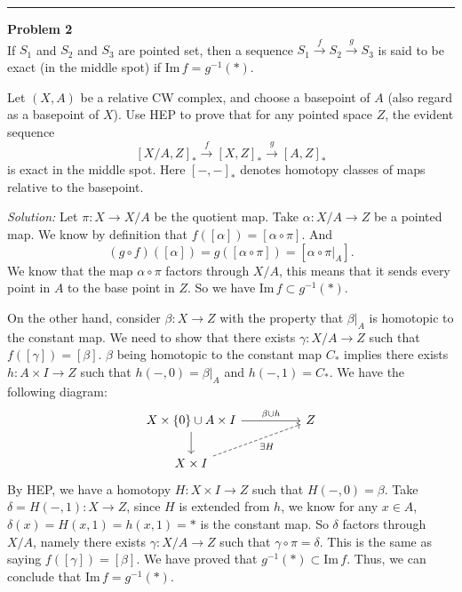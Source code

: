 \documentclass[a4paper, 12pt]{article}
\newenvironment{problem}[2][Problem]
    { \begin{mdframed}[backgroundcolor=gray!20] \textbf{#1 #2} \\}
    {  \end{mdframed}}
\newenvironment{solution}
    {\textit{Solution:}}
    {}
\newcommand{\im}{\text{Im}\,}
\begin{document}
\noindent\rule{7in}{2.8pt}
\begin{problem}{2}
If \(S_1\) and \(S_2\) and \(S_3\) are pointed set, then a sequence \(S_1\xrightarrow{f}S_2\xrightarrow{g}S_3\) is said to be exact (in the middle spot) if \(\im f=g^{-1}(*)\). 

Let \((X,A)\) be a relative CW complex, and choose a basepoint of \(A\) (also regard as a basepoint of \(X\)). Use HEP to prove that for any pointed space \(Z\), the evident sequence 
\[[X/A,Z]_*\xrightarrow{f} [X,Z]_*\xrightarrow{g} [A,Z]_*\] 
is exact in the middle spot. Here \([-,-]_*\) denotes homotopy classes of maps relative to the basepoint.
\end{problem}
\begin{solution}
Let \(\pi:X\rightarrow X/A\) be the quotient map. Take \(\alpha:X/A\rightarrow Z\) be a pointed map. We know by definition that \(f([\alpha])=[\alpha\circ \pi]\). And 
\[(g\circ f)([\alpha])=g([\alpha\circ \pi])=[\alpha\circ \pi|_A].\]
We know that the map \(\alpha\circ \pi\) factors through \(X/A\), this means that it sends every point in \(A\) to the base point in \(Z\). So we have \(\im f\subset g^{-1}(*)\). 

On the other hand, consider \(\beta:X\rightarrow Z\) with the property that \(\beta|_A\) is homotopic to the constant map. We need to show that there exists \(\gamma:X/A\rightarrow Z\) such that \(f([\gamma])=[\beta]\). \(\beta\) being 
homotopic to the constant map \(C_*\) implies there exists \(h:A\times I\rightarrow Z\) such that \(h(-,0)=\beta|_A\) and \(h(-,1)=C_*\). We have the following diagram:
\[\begin{tikzcd}
	{X\times\left\{0\right\} \cup A\times I } && Z \\
	{X\times I}
	\arrow["{\beta\cup h}", from=1-1, to=1-3]
	\arrow[from=1-1, to=2-1]
	\arrow["{\exists H}"', dashed, from=2-1, to=1-3]
\end{tikzcd}\]
By HEP, we have a homotopy \(H:X\times I\rightarrow Z\) such that \(H(-,0)=\beta\). Take \(\delta=H(-,1):X\rightarrow Z\), since \(H\) is extended from \(h\), we know for any \(x\in A\), \(\delta(x)=H(x,1)=h(x,1)=*\) is the constant map. So 
\(\delta\) factors through \(X/A\), namely there exists \(\gamma:X/A\rightarrow Z\) such that \(\gamma\circ \pi=\delta\). This is the same as saying \(f([\gamma])=[\beta]\). We have proved that 
\(g^{-1}(*)\subset \im f\). Thus, we can conclude that \(\im f=g^{-1}(*)\).
\end{solution}
\end{document}
